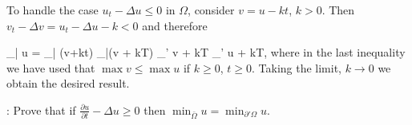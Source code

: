 To handle the case $u_t - \Delta u \leq 0$ in $\Omega$, consider $v = u - kt$, $k>0$. 
Then $v_t - \Delta v = u_t - \Delta u - k < 0$ and therefore 

\beq 
\max_{\bar \Omega} u = \max_{\bar \Omega} (v+kt) \leq \max_{\bar \Omega}(v + kT)\; \leq \; 
\max_{\pa' \Omega} v \; + \; kT \; \leq \; \max_{\pa' \Omega} u + kT, 
\eeq %
where in the last inequality we have used that $\max v \leq \max u$ if $k\geq 0$, $t\geq 0$. 
Taking the limit, $k \rightarrow 0$ we obtain the desired result.

\ejer: Prove that if $\frac{\partial u}{\partial t} - \Delta u \geq 0$ then $\min_{\bar{\Omega}}u = \min_{\partial' \Omega} u$.






